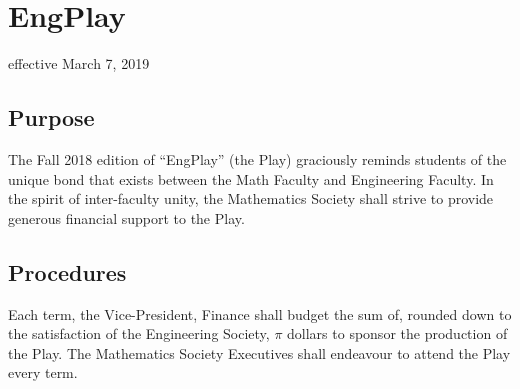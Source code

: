 \section{EngPlay}
effective March 7, 2019

\subsection{Purpose}

The Fall 2018 edition of ``EngPlay'' (the Play) graciously reminds students of the unique bond that exists between the Math Faculty and Engineering Faculty. In the spirit of inter-faculty unity, the Mathematics Society shall strive to provide generous financial support to the Play.

\subsection{Procedures}

Each term, the Vice-President, Finance shall budget the sum of, rounded down to the satisfaction of the Engineering Society, $\pi$ dollars to sponsor the production of the Play. The Mathematics Society Executives shall endeavour to attend the Play every term.